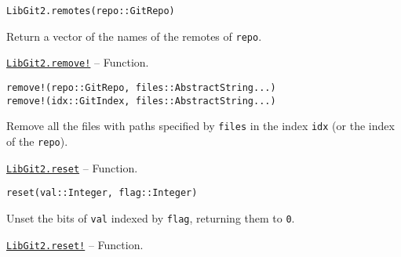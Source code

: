 \begin{adjustwidth}{2em}{0pt}


\begin{verbatim}
LibGit2.remotes(repo::GitRepo)
\end{verbatim}

Return a vector of the names of the remotes of \texttt{repo}.



\end{adjustwidth}
\hypertarget{12673554228490546577}{}
\hyperlink{12673554228490546577}{\texttt{LibGit2.remove!}}  -- {Function.}

\begin{adjustwidth}{2em}{0pt}


\begin{verbatim}
remove!(repo::GitRepo, files::AbstractString...)
remove!(idx::GitIndex, files::AbstractString...)
\end{verbatim}

Remove all the files with paths specified by \texttt{files} in the index \texttt{idx} (or the index of the \texttt{repo}).



\end{adjustwidth}
\hypertarget{6133575189326240402}{}
\hyperlink{6133575189326240402}{\texttt{LibGit2.reset}}  -- {Function.}

\begin{adjustwidth}{2em}{0pt}


\begin{verbatim}
reset(val::Integer, flag::Integer)
\end{verbatim}

Unset the bits of \texttt{val} indexed by \texttt{flag}, returning them to \texttt{0}.



\end{adjustwidth}
\hypertarget{6684497681285141047}{}
\hyperlink{6684497681285141047}{\texttt{LibGit2.reset!}}  -- {Function.}

